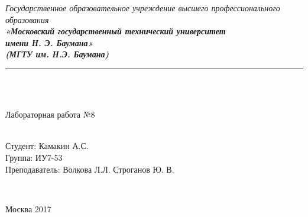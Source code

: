 \documentclass[utf8x, 12pt]{G7-32} %
\begin{document}
\frontmatter %



\begin{center}
	\hfill \break
	\textit{
		\normalsize{Государственное образовательное учреждение высшего профессионального образования}}\\ 
	
	\textit{
		\normalsize  {\bf  «Московский государственный технический университет}\\ 
		\normalsize  {\bf имени Н. Э. Баумана»}\\
		\normalsize  {\bf (МГТУ им. Н.Э. Баумана)}\\
	}
	\noindent\rule{\textwidth}{2pt}
	\hfill \break
	\noindent
	\\
	\noindent
	\\
	\hfill\break
	\hfill \break
	\hfill \break
	\hfill \break
	
	\hfill \break
	\large{Лабораторная работа №8\\ }\\
	\hfill \break
	\hfill \break
	\hfill \break
	\hfill \break
	\hfill \break	
	\normalsize {
		\begin{minipage}[t]{7cm}
		\end{minipage}
		\hfill
		\begin{minipage}[t]{7cm}
			\flushright
			Студент: Камакин А.С.\\
			Группа: ИУ7-53\\
			Преподаватель: Волкова Л.Л.
			Строганов Ю. В.
		\end{minipage}
	}\\
	\hfill \break	
	\hfill \break
	\hfill \break
	\hfill \break
	\hfill \break
\end{center}
\hfill \break
\hfill \break
\begin{center} Москва 2017 \end{center}

\thispagestyle{empty} %

\newpage

\mainmatter %
\end{document}
